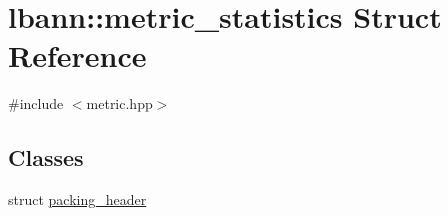 \hypertarget{structlbann_1_1metric__statistics}{}\section{lbann\+:\+:metric\+\_\+statistics Struct Reference}
\label{structlbann_1_1metric__statistics}


{\ttfamily \#include $<$metric.\+hpp$>$}

\subsection*{Classes}
\begin{DoxyCompactItemize}
\item 
struct \hyperlink{structlbann_1_1metric__statistics_1_1packing__header}{packing\+\_\+header}
\end{DoxyCompactItemize}
